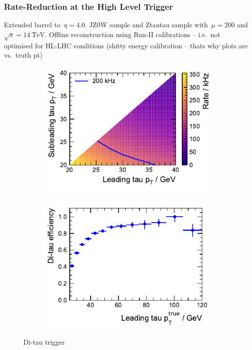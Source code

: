 \subsubsection{Rate-Reduction at the High Level Trigger}
\label{sec:hlt_rate_reduction}

Extended barrel to~$\eta = \num{4.0}$. JZ0W sample  and
Ztautau sample with~$\mu = \num{200}$ and $\sqrt{s} = \SI{14}{\TeV}$. Offline
reconstruction using Run-II calibrations -- i.e.\ not optimised for HL-LHC
conditions (shitty energy calibration -- thats why plots are vs.\ truth pt)

\begin{figure}[htb]
  \centering
  \begin{subfigure}[t]{0.48\textwidth}
    \centering
    \includegraphics{./figures/rnn/trigger/pt_rate_reg.pdf}
  \end{subfigure}\hfill
  \begin{subfigure}[t]{0.48\textwidth}
    \centering
    \includegraphics{./figures/rnn/trigger/taueff_reg.pdf}
  \end{subfigure}
  \caption{Di-tau trigger}
  \label{fig:rnn_ditau_trigger}
\end{figure}

